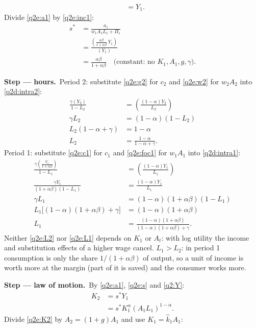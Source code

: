 \documentclass[11pt,a4paper]{article}
\newcommand{\passo}[2]{\par\smallskip\noindent\textbf{Step --- #1.}~#2}
\begin{document}
\begin{sol}
\begin{align}
&= Y_1. \label{q2e:inc1}
\end{align}
Divide \eqref{q2e:a1} by \eqref{q2e:inc1}:
\begin{align}
s^\ast &= \frac{a_1}{w_1A_1L_1+\Pi_1}\nonumber\\
&= \frac{\left(\frac{\alpha\beta}{1+\alpha\beta}\,Y_1\right)}{(Y_1)}\nonumber\\
&= \boxed{\frac{\alpha\beta}{1+\alpha\beta}}\quad\text{(constant: no }K_1,A_1,g,\gamma\text{)}. \label{q2e:s}
\end{align}
\passo{hours}{Period 2: substitute \eqref{q2e:g2} for $c_2$ and \eqref{q2e:w2} for $w_2A_2$ into
\eqref{q2d:intra2}:}
\begin{align}
\frac{\gamma(Y_2)}{1-L_2} &= \left(\frac{(1-\alpha)Y_2}{L_2}\right)\nonumber\\
\gamma L_2 &= (1-\alpha)(1-L_2)\nonumber\\
L_2(1-\alpha+\gamma) &= 1-\alpha\nonumber\\
L_2 &= \boxed{\frac{1-\alpha}{1-\alpha+\gamma}}. \label{q2e:L2}
\end{align}
Period 1: substitute \eqref{q2e:c1} for $c_1$ and \eqref{q2e:foc1} for $w_1A_1$ into
\eqref{q2d:intra1}:
\begin{align}
\frac{\gamma\left(\frac{Y_1}{1+\alpha\beta}\right)}{1-L_1} &= \left(\frac{(1-\alpha)Y_1}{L_1}\right)\nonumber\\
\frac{\gamma Y_1}{(1+\alpha\beta)(1-L_1)} &= \frac{(1-\alpha)Y_1}{L_1}\nonumber\\
\gamma L_1 &= (1-\alpha)(1+\alpha\beta)(1-L_1)\nonumber\\
L_1\big[(1-\alpha)(1+\alpha\beta)+\gamma\big] &= (1-\alpha)(1+\alpha\beta)\nonumber\\
L_1 &= \boxed{\frac{(1-\alpha)(1+\alpha\beta)}{(1-\alpha)(1+\alpha\beta)+\gamma}}. \label{q2e:L1}
\end{align}
Neither \eqref{q2e:L2} nor \eqref{q2e:L1} depends on $K_1$ or $A_t$: with log utility the income and
substitution effects of a higher wage cancel. $L_1>L_2$: in period 1 consumption is only the share
$1/(1+\alpha\beta)$ of output, so a unit of income is worth more at the margin (part of it is saved)
and the consumer works more.
\passo{law of motion}{By \eqref{q2e:a1}, \eqref{q2e:s} and \eqref{q2:Y}:}
\begin{align}
K_2 &= s^\ast Y_1\nonumber\\
&= s^\ast K_1^{\alpha}(A_1L_1)^{1-\alpha}. \label{q2e:K2}
\end{align}
Divide \eqref{q2e:K2} by $A_2=(1+g)A_1$ and use $K_1=\hat k_1A_1$:

\end{sol}
\end{document}
